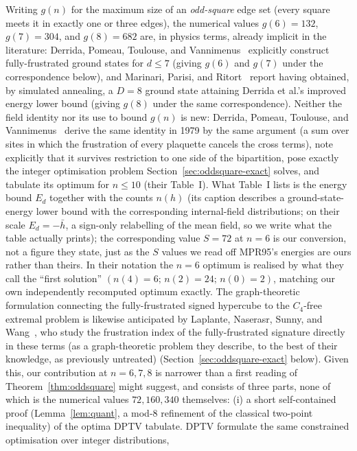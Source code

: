 \documentclass[12pt,a4paper]{article}
\theoremstyle{definition}
\begin{document}
Writing $g(n)$ for the maximum size of an \emph{odd-square} edge set (every
square meets it in exactly one or three edges), the numerical values
$g(6)=132$, $g(7)=304$, and $g(8)=682$ are, in physics terms, already
implicit in the literature: Derrida, Pomeau, Toulouse, and
Vannimenus~\cite{DPTV79} explicitly construct fully-frustrated ground
states for $d\le7$ (giving $g(6)$ and $g(7)$ under the correspondence
below), and Marinari, Parisi, and Ritort~\cite{MPR95} report having
obtained, by simulated annealing, a $D=8$ ground state attaining
Derrida et al.'s improved energy lower bound (giving $g(8)$ under the
same correspondence). Neither the field identity nor its use to bound
$g(n)$ is new: Derrida, Pomeau, Toulouse, and Vannimenus~\cite{DPTV79}
derive the same identity in 1979 by the same argument (a sum over sites
in which the frustration of every plaquette cancels the cross terms),
note explicitly that it survives restriction to one side of the
bipartition, pose exactly the integer optimisation problem
Section~\ref{sec:oddsquare-exact} solves, and tabulate its optimum for
$n\le10$ (their Table~I). What Table~I lists is the energy bound $E_d$ together with the
counts $n(h)$ (its caption describes a ground-state-energy lower bound with
the corresponding internal-field distributions; on their scale
$E_d=-\bar h$, a sign-only relabelling of the mean field, so we write what
the table actually prints); the corresponding value $S=72$ at $n=6$ is our
conversion, not a figure they state, just as the $S$ values we read off MPR95's energies are
ours rather than theirs. In their notation the $n=6$ optimum is realised by
what they call the ``first solution''
$(n(4){=}6;\,n(2){=}24;\,n(0){=}2)$, matching our own independently
recomputed optimum exactly. The graph-theoretic formulation connecting
the fully-frustrated signed hypercube to the $C_4$-free extremal
problem is likewise anticipated by Laplante, Naserasr, Sunny, and
Wang~\cite{LNSW26}, who study the frustration index of the
fully-frustrated signature directly in these terms (as a graph-theoretic
problem they describe, to the best of their knowledge, as previously
untreated) (Section~\ref{sec:oddsquare-exact} below). Given this, our
contribution at $n=6,7,8$ is narrower than a first reading of
Theorem~\ref{thm:oddsquare} might suggest, and consists of three
parts, none of which is the numerical values $72,160,340$ themselves:
(i) a short self-contained proof (Lemma~\ref{lem:quant}, a mod-$8$ refinement
of the classical two-point inequality) of the optima DPTV tabulate. DPTV
formulate the same constrained optimisation over integer distributions,
\end{document}
